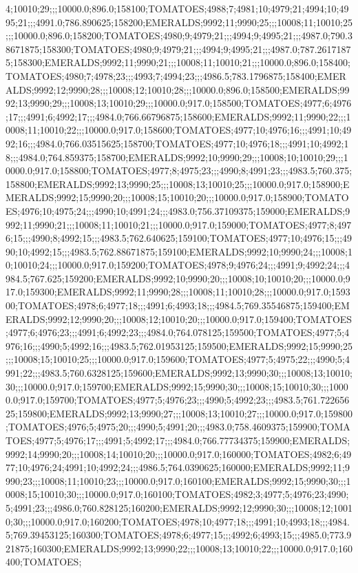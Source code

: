 4;10010;29;;;10000.0;896.0;158100;TOMATOES;4988;7;4981;10;4979;21;4994;10;4995;21;;;4991.0;786.890625;158200;EMERALDS;9992;11;9990;25;;;10008;11;10010;25;;;10000.0;896.0;158200;TOMATOES;4980;9;4979;21;;;4994;9;4995;21;;;4987.0;790.38671875;158300;TOMATOES;4980;9;4979;21;;;4994;9;4995;21;;;4987.0;787.26171875;158300;EMERALDS;9992;11;9990;21;;;10008;11;10010;21;;;10000.0;896.0;158400;TOMATOES;4980;7;4978;23;;;4993;7;4994;23;;;4986.5;783.1796875;158400;EMERALDS;9992;12;9990;28;;;10008;12;10010;28;;;10000.0;896.0;158500;EMERALDS;9992;13;9990;29;;;10008;13;10010;29;;;10000.0;917.0;158500;TOMATOES;4977;6;4976;17;;;4991;6;4992;17;;;4984.0;766.66796875;158600;EMERALDS;9992;11;9990;22;;;10008;11;10010;22;;;10000.0;917.0;158600;TOMATOES;4977;10;4976;16;;;4991;10;4992;16;;;4984.0;766.03515625;158700;TOMATOES;4977;10;4976;18;;;4991;10;4992;18;;;4984.0;764.859375;158700;EMERALDS;9992;10;9990;29;;;10008;10;10010;29;;;10000.0;917.0;158800;TOMATOES;4977;8;4975;23;;;4990;8;4991;23;;;4983.5;760.375;158800;EMERALDS;9992;13;9990;25;;;10008;13;10010;25;;;10000.0;917.0;158900;EMERALDS;9992;15;9990;20;;;10008;15;10010;20;;;10000.0;917.0;158900;TOMATOES;4976;10;4975;24;;;4990;10;4991;24;;;4983.0;756.37109375;159000;EMERALDS;9992;11;9990;21;;;10008;11;10010;21;;;10000.0;917.0;159000;TOMATOES;4977;8;4976;15;;;4990;8;4992;15;;;4983.5;762.640625;159100;TOMATOES;4977;10;4976;15;;;4990;10;4992;15;;;4983.5;762.88671875;159100;EMERALDS;9992;10;9990;24;;;10008;10;10010;24;;;10000.0;917.0;159200;TOMATOES;4978;9;4976;24;;;4991;9;4992;24;;;4984.5;767.625;159200;EMERALDS;9992;10;9990;20;;;10008;10;10010;20;;;10000.0;917.0;159300;EMERALDS;9992;11;9990;28;;;10008;11;10010;28;;;10000.0;917.0;159300;TOMATOES;4978;6;4977;18;;;4991;6;4993;18;;;4984.5;769.35546875;159400;EMERALDS;9992;12;9990;20;;;10008;12;10010;20;;;10000.0;917.0;159400;TOMATOES;4977;6;4976;23;;;4991;6;4992;23;;;4984.0;764.078125;159500;TOMATOES;4977;5;4976;16;;;4990;5;4992;16;;;4983.5;762.01953125;159500;EMERALDS;9992;15;9990;25;;;10008;15;10010;25;;;10000.0;917.0;159600;TOMATOES;4977;5;4975;22;;;4990;5;4991;22;;;4983.5;760.6328125;159600;EMERALDS;9992;13;9990;30;;;10008;13;10010;30;;;10000.0;917.0;159700;EMERALDS;9992;15;9990;30;;;10008;15;10010;30;;;10000.0;917.0;159700;TOMATOES;4977;5;4976;23;;;4990;5;4992;23;;;4983.5;761.72265625;159800;EMERALDS;9992;13;9990;27;;;10008;13;10010;27;;;10000.0;917.0;159800;TOMATOES;4976;5;4975;20;;;4990;5;4991;20;;;4983.0;758.4609375;159900;TOMATOES;4977;5;4976;17;;;4991;5;4992;17;;;4984.0;766.77734375;159900;EMERALDS;9992;14;9990;20;;;10008;14;10010;20;;;10000.0;917.0;160000;TOMATOES;4982;6;4977;10;4976;24;4991;10;4992;24;;;4986.5;764.0390625;160000;EMERALDS;9992;11;9990;23;;;10008;11;10010;23;;;10000.0;917.0;160100;EMERALDS;9992;15;9990;30;;;10008;15;10010;30;;;10000.0;917.0;160100;TOMATOES;4982;3;4977;5;4976;23;4990;5;4991;23;;;4986.0;760.828125;160200;EMERALDS;9992;12;9990;30;;;10008;12;10010;30;;;10000.0;917.0;160200;TOMATOES;4978;10;4977;18;;;4991;10;4993;18;;;4984.5;769.39453125;160300;TOMATOES;4978;6;4977;15;;;4992;6;4993;15;;;4985.0;773.921875;160300;EMERALDS;9992;13;9990;22;;;10008;13;10010;22;;;10000.0;917.0;160400;TOMATOES;